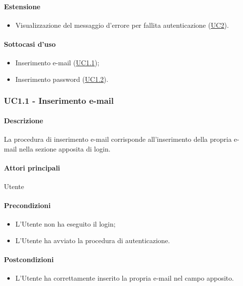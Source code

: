 \paragraph*{Estensione}
\begin{itemize}
  \item Visualizzazione del messaggio d’errore per fallita autenticazione (\hyperref[UC2]{UC2}).
\end{itemize}

\paragraph*{Sottocasi d'uso}
\begin{itemize}
  \item Inserimento e-mail (\hyperref[UC1point1]{UC1.1});
  \item Inserimento password (\hyperref[UC1point2]{UC1.2}).
\end{itemize}


\subsubsection{UC1.1 - Inserimento e-mail}\label{UC1point1}
\paragraph*{Descrizione}
La procedura di inserimento e-mail corrisponde all’inserimento della propria e-mail nella sezione apposita di login.

\paragraph*{Attori principali}
Utente

\paragraph*{Precondizioni}
\begin{itemize}
  \item L’Utente non ha eseguito il login;
  \item L’Utente ha avviato la procedura di autenticazione.  
\end{itemize}

\paragraph*{Postcondizioni}
\begin{itemize}
  \item L’Utente ha correttamente inserito la propria e-mail nel campo apposito.
\end{itemize}

